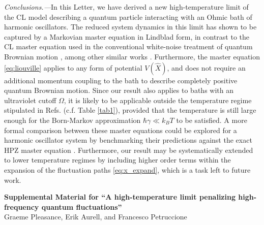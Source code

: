 \documentclass[prl,twocolumn,superscriptaddress,amsmath,amssymb]{revtex4-2}
\newcommand{\hb}{\hbar}
\begin{document}
{\it Conclusions.---}In this Letter, we have derived a new high-temperature limit of the CL model describing a quantum particle interacting with an Ohmic bath of harmonic oscillators. The reduced system dynamics in this limit has shown to be captured by a Markovian master equation in Lindblad form, in contrast to the CL master equation used in the conventional white-noise treatment of quantum Brownian motion \cite{CaldeiraLeggettA}, among other similar works \cite{Diosi1993,Diosi1993a,Halliwell1995,Gao1997,Ford1999,Vacchini2000,Petruccione2005}. 
% 
Furthermore, the master equation \eqref{eq:liouville} applies to any form of potential $V(\hat{X})$, and does not require an additional momentum coupling to the bath to describe completely positive quantum Brownian motion. Since our result also applies to baths with an ultraviolet cutoff $\Omega$, it is likely to be applicable outside the temperature regime stipulated in Refs. \cite{BP2002,CaldeiraLeggettA,Diosi1993} (c.f. Table \ref{tab1}), provided that the temperature is still large enough for the Born-Markov approximation $\hb\gamma\ll k_BT$ to be satisfied. A more formal comparison between these master equations could be explored for a harmonic oscillator system by benchmarking their predictions against the exact HPZ master equation \cite{Hu1992}. Furthermore, our result may be systematically extended to lower temperature regimes by including higher order terms within the expansion of the fluctuation paths \eqref{eq:x_expand}, which is a task left to future work.

 



\appendix
\widetext
\pagebreak


\begin{center}
\textbf{\large Supplemental Material for ``A high-temperature limit penalizing high-frequency quantum fluctuations''}\\[1em]
Graeme Pleasance, Erik Aurell, and Francesco Petruccione 
\end{center}
\vspace{1em}


\titleformat{\subsection}{\bfseries}{\thesubsection}{1em}{}
\end{document}
